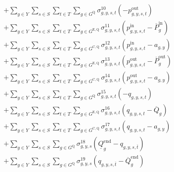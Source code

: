 \documentclass{article}
\newcommand{\sStorage}{G^{\mathrm{Q}}}
\newcommand{\sStorageExisting}{G^{\mathrm{E,Q}}}
\newcommand{\sStorageCandidate}{G^{\mathrm{C,Q}}}
\newcommand{\sYears}{Y}
\newcommand{\sScenarios}{S}
\newcommand{\sIntervals}{T}
\newcommand{\iGenerator}{g}
\newcommand{\iYear}{y}
\newcommand{\iScenario}{s}
\newcommand{\iInterval}{t}
\newcommand{\iIntervalTerminal}{\overline{\iInterval}}
\newcommand{\cPowerChargingMax}[1][\iGenerator]{\overline{P}^{\mathrm{in}}_{#1}}
\newcommand{\cPowerDischargingMax}[1][\iGenerator]{\overline{P}^{\mathrm{out}}_{#1}}
\newcommand{\cStorageUnitEnergyMax}[1][\iGenerator]{\overline{Q}_{#1}}
\newcommand{\cStorageUnitEnergyIntervalEndMax}[1][\iGenerator]{\overline{Q}^{\mathrm{end}}_{#1}}
\newcommand{\cStorageUnitEnergyIntervalEndMin}[1][\iGenerator]{\underline{Q}^{\mathrm{end}}_{#1}}
\newcommand{\vPowerIn}[1][\iGenerator,\iYear,\iScenario,\iInterval]{p^{\mathrm{in}}_{#1}}
\newcommand{\vPowerOut}[1][\iGenerator,\iYear,\iScenario,\iInterval]{p^{\mathrm{out}}_{#1}}
\newcommand{\vStorageUnitEnergy}[1][\iGenerator,\iYear,\iScenario,\iInterval]{q_{#1}}
\newcommand{\vInstalledCapacityTotal}[1][\iGenerator,\iYear]{a_{#1}}
\newcommand{\dNonNegativeDischarging}[1][\iGenerator,\iYear,\iScenario,\iInterval]{\sigma_{#1}^{10}}
\newcommand{\dMaxChargingRateExisting}[1][\iGenerator,\iYear,\iScenario,\iInterval]{\sigma_{#1}^{11}}
\newcommand{\dMaxChargingRateCandidate}[1][\iGenerator,\iYear,\iScenario,\iInterval]{\sigma_{#1}^{12}}
\newcommand{\dMaxDischargingRateExisting}[1][\iGenerator,\iYear,\iScenario,\iInterval]{\sigma_{#1}^{13}}
\newcommand{\dMaxDischargingRateCandidate}[1][\iGenerator,\iYear,\iScenario,\iInterval]{\sigma_{#1}^{14}}
\newcommand{\dNonNegativeStorageEnergy}[1][\iGenerator,\iYear,\iScenario,\iInterval]{\sigma_{#1}^{15}}
\newcommand{\dMaxStorageEnergyExisting}[1][\iGenerator,\iYear,\iScenario,\iInterval]{\sigma_{#1}^{16}}
\newcommand{\dMaxStorageEnergyCandidate}[1][\iGenerator,\iYear,\iScenario,\iInterval]{\sigma_{#1}^{17}}
\newcommand{\dMinStorageEnergyIntervalEnd}[1][\iGenerator,\iYear,\iScenario]{\sigma_{#1}^{18}}
\newcommand{\dMaxStorageEnergyIntervalEnd}[1][\iGenerator,\iYear,\iScenario]{\sigma_{#1}^{19}}
\begin{document}
\begin{align}
		& + \sum\limits_{\iYear \in \sYears}\sum\limits_{\iScenario \in \sScenarios}\sum\limits_{\iInterval \in \sIntervals} \sum\limits_{\iGenerator \in \sStorage} \dNonNegativeDischarging \left(-\vPowerOut\right)\\
		& + \sum\limits_{\iYear \in \sYears}\sum\limits_{\iScenario \in \sScenarios}\sum\limits_{\iInterval \in \sIntervals} \sum\limits_{\iGenerator \in \sStorageExisting} \dMaxChargingRateExisting \left(\vPowerIn - \cPowerChargingMax\right)\\
		& + \sum\limits_{\iYear \in \sYears}\sum\limits_{\iScenario \in \sScenarios}\sum\limits_{\iInterval \in \sIntervals} \sum\limits_{\iGenerator \in \sStorageCandidate} \dMaxChargingRateCandidate \left(\vPowerIn - \vInstalledCapacityTotal\right)\\
		& + \sum\limits_{\iYear \in \sYears}\sum\limits_{\iScenario \in \sScenarios}\sum\limits_{\iInterval \in \sIntervals} \sum\limits_{\iGenerator \in \sStorageExisting} \dMaxDischargingRateExisting \left(\vPowerOut - \cPowerDischargingMax\right)\\
		& + \sum\limits_{\iYear \in \sYears}\sum\limits_{\iScenario \in \sScenarios}\sum\limits_{\iInterval \in \sIntervals} \sum\limits_{\iGenerator \in \sStorageCandidate} \dMaxDischargingRateCandidate \left(\vPowerOut - \vInstalledCapacityTotal\right)\\
		& + \sum\limits_{\iYear \in \sYears}\sum\limits_{\iScenario \in \sScenarios}\sum\limits_{\iInterval \in \sIntervals} \sum\limits_{\iGenerator \in \sStorage} \dNonNegativeStorageEnergy \left(- \vStorageUnitEnergy\right)\\
		& + \sum\limits_{\iYear \in \sYears}\sum\limits_{\iScenario \in \sScenarios}\sum\limits_{\iInterval \in \sIntervals} \sum\limits_{\iGenerator \in \sStorageExisting} \dMaxStorageEnergyExisting \left(\vStorageUnitEnergy - \cStorageUnitEnergyMax\right)\\
		& + \sum\limits_{\iYear \in \sYears}\sum\limits_{\iScenario \in \sScenarios}\sum\limits_{\iInterval \in \sIntervals} \sum\limits_{\iGenerator \in \sStorageCandidate} \dMaxStorageEnergyCandidate \left(\vStorageUnitEnergy - \vInstalledCapacityTotal\right)\\
		& + \sum\limits_{\iYear \in \sYears}\sum\limits_{\iScenario \in \sScenarios} \sum\limits_{\iGenerator \in \sStorage} \dMinStorageEnergyIntervalEnd \left(\cStorageUnitEnergyIntervalEndMin - \vStorageUnitEnergy[\iGenerator,\iYear,\iScenario,\iIntervalTerminal]\right)\\
		& + \sum\limits_{\iYear \in \sYears}\sum\limits_{\iScenario \in \sScenarios} \sum\limits_{\iGenerator \in \sStorage} \dMaxStorageEnergyIntervalEnd \left(\vStorageUnitEnergy[\iGenerator,\iYear,\iScenario,\iIntervalTerminal] - \cStorageUnitEnergyIntervalEndMax\right)\\

\end{align}
\end{document}
